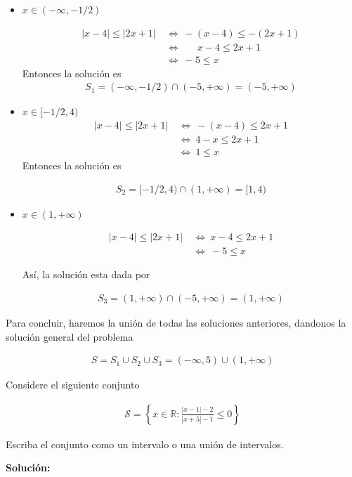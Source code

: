 \documentclass[12pt]{book}
\begin{document}
\begin{itemize}
    \item $x \in (-\infty,-1/2)$

    \begin{align*}
         |x-4|\leq |2x+1| \ &\Longleftrightarrow \ -(x-4)\leq - (2x+1) \\
          &\Longleftrightarrow \quad \ \ \ x-4 \leq 2x+1 \\
           &\Longleftrightarrow  \ -5 \leq x 
    \end{align*}
    Entonces la solución es 
    \begin{align*}
        S_1= (-\infty,-1/2) \cap (-5,+\infty)=(-5,+\infty)
    \end{align*}

    \item $x \in [-1/2,4)$
\begin{align*}
      |x-4|\leq |2x+1| \ &\Longleftrightarrow \ -(x-4) \leq 2x+1 \\
      &\Longleftrightarrow \ 4-x \leq 2x+1  \\
       &\Longleftrightarrow \ 1 \leq x
\end{align*}
Entonces la solución es 

\begin{align*}
    S_2= [-1/2,4) \cap (1, +\infty)=[1,4)
\end{align*}

\item $x \in (1, + \infty)$

\begin{align*}
     |x-4|\leq |2x+1| \ &\Longleftrightarrow \ x-4 \leq 2x+1  \\
      &\Longleftrightarrow \ -5 \leq x
\end{align*}

Así, la solución esta dada por 

\begin{align*}
    S_3 = (1, + \infty) \cap (-5, +\infty)=(1,+\infty)
\end{align*}
\end{itemize}
Para concluir, haremos la unión de todas las soluciones anteriores, dandonos la solución general del problema

\begin{align*}
    S=S_1 \cup S_2 \cup S_3=(-\infty,5) \cup (1, +\infty)
\end{align*}

\begin{prob}{}{}
Considere el siguiente conjunto 

\begin{align}
    \mathcal{S}= \left\{ x \in \mathbb{R} : \frac{|x-1|-2}{|x+5|-1} \leq 0\right\}
\end{align}

Escriba el conjunto como un intervalo o una unión de intervalos.
\end{prob}
\textbf{Solución:}
\end{document}
